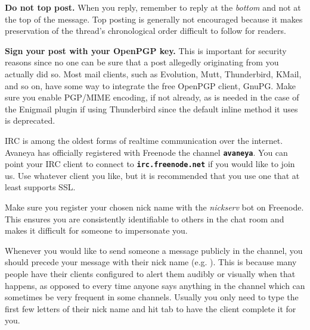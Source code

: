 \item
{\bf Do not top post.} When you reply, remember to reply at the {\it bottom} and not at the top of the message. Top posting is generally not encouraged because it makes preservation of the thread's chronological order difficult to follow for readers.

\item
{\bf Sign your post with your OpenPGP key.} This is important for security reasons since no one can be sure that a post allegedly originating from you actually did so. Most mail clients, such as Evolution, Mutt, Thunderbird, KMail, and so on, have some way to integrate the free OpenPGP client, GnuPG. Make sure you enable PGP/MIME encoding, if not already, as is needed in the case of the Enigmail plugin if using Thunderbird since the default inline method it uses is deprecated.
\stopitemize


IRC is among the oldest forms of realtime communication over the internet. Avaneya has officially registered with Freenode the channel {\bf \tt \type{#}avaneya}. You can point your IRC client to connect to {\bf \tt irc.freenode.net} if you would like to join us. Use whatever client you like, but it is recommended that you use one that at least supports SSL.

Make sure you register your chosen nick name with the {\it nickserv} bot on Freenode. This ensures you are consistently identifiable to others in the chat room and makes it difficult for someone to impersonate you.

Whenever you would like to send someone a message publicly in the channel, you should precede your message with their nick name (e.g. ). This is because many people have their clients configured to alert them audibly or visually when that happens, as opposed to every time anyone says anything in the channel which can sometimes be very frequent in some channels. Usually you only need to type the first few letters of their nick name and hit tab to have the client complete it for you.


